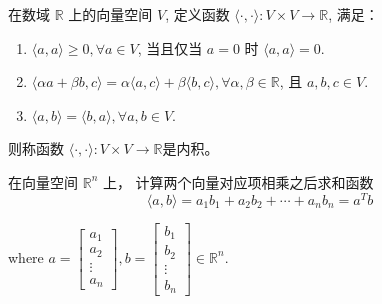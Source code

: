\begin{definition}[内积]
    在数域 $  \mathbb{R}  $ 上的向量空间 $  V  $, 定义函数 $  \langle\cdot,\cdot\rangle:V \times V \rightarrow \mathbb{R}  $, 满足：

    \begin{enumerate}
        \item $ \langle{a}, {a}\rangle \geq 0, \forall {a} \in V $, 当且仅当 $a=0$ 时 $ \langle a, a\rangle=0 $.
        \item $  \langle\alpha {a}+\beta {b}, c\rangle=\alpha\langle{a}, c\rangle+\beta\langle{b}, c\rangle, \forall \alpha, \beta \in \mathbb{R}  $, 且 $  {a}, {b}, c \in V  $.
        \item $  \langle{a}, {b}\rangle=\langle{b}, {a}\rangle, \forall {a}, {b} \in V  $.
    \end{enumerate}

    则称函数 $  \langle\cdot,\cdot\rangle:V \times V \rightarrow \mathbb{R}  $是内积。 
\end{definition}

\begin{example}
    在向量空间 $  \mathbb{R}^{n}  $ 上，  计算两个向量对应项相乘之后求和函数
    \begin{equation} \langle a, b\rangle=a_{1} b_{1}+a_{2} b_{2}+\cdots+a_{n} b_{n}=a^{T}{b} \end{equation}

where $  a=\left[\begin{array}{c}a_{1} \\ a_{2} \\ \vdots \\ a_{n}\end{array}\right], b=\left[\begin{array}{c}b_{1} \\ b_{2} \\ \vdots \\ b_{n}\end{array}\right] \in \mathbb{R}^{n}  $.
\end{example}

